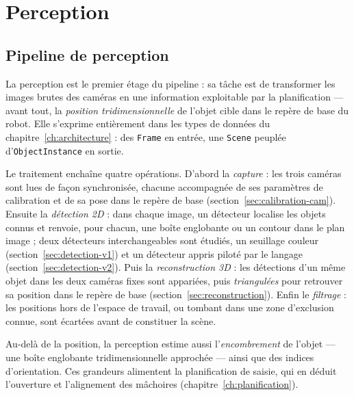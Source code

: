 \chapter{Perception}
\label{ch:perception}
\section{Pipeline de perception}
\label{sec:perception-pipeline}

La perception est le premier étage du pipeline : sa tâche est de transformer les images brutes des caméras en une information exploitable par la planification --- avant tout, la \emph{position tridimensionnelle} de l'objet cible dans le repère de base du robot. Elle s'exprime entièrement dans les types de données du chapitre~\ref{ch:architecture} : des \texttt{Frame} en entrée, une \texttt{Scene} peuplée d'\texttt{ObjectInstance} en sortie.

Le traitement enchaîne quatre opérations. D'abord la \emph{capture} : les trois caméras sont lues de façon synchronisée, chacune accompagnée de ses paramètres de calibration et de sa pose dans le repère de base (section~\ref{sec:calibration-cam}). Ensuite la \emph{détection 2D} : dans chaque image, un détecteur localise les objets connus et renvoie, pour chacun, une boîte englobante ou un contour dans le plan image ; deux détecteurs interchangeables sont étudiés, un seuillage couleur (section~\ref{sec:detection-v1}) et un détecteur appris piloté par le langage (section~\ref{sec:detection-v2}). Puis la \emph{reconstruction 3D} : les détections d'un même objet dans les deux caméras fixes sont appariées, puis \emph{triangulées} pour retrouver sa position dans le repère de base (section~\ref{sec:reconstruction}). Enfin le \emph{filtrage} : les positions hors de l'espace de travail, ou tombant dans une zone d'exclusion connue, sont écartées avant de constituer la scène.


Au-delà de la position, la perception estime aussi l'\emph{encombrement} de l'objet --- une boîte englobante tridimensionnelle approchée --- ainsi que des indices d'orientation. Ces grandeurs alimentent la planification de saisie, qui en déduit l'ouverture et l'alignement des mâchoires (chapitre~\ref{ch:planification}).

